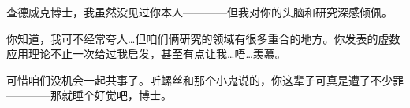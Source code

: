\begin{newThanks}
    查德威克博士，我虽然没见过你本人————但我对你的头脑和研究深感倾佩。

    你知道，我可不经常夸人\ldots 但咱们俩研究的领域有很多重合的地方。你发表的虚数应用理论不止一次给过我启发，甚至有点让我\ldots 唔\ldots 羡慕。

    可惜咱们没机会一起共事了。听螺丝和那个小鬼说的，你这辈子可真是遭了不少罪————那就睡个好觉吧，博士。
\end{newThanks}
